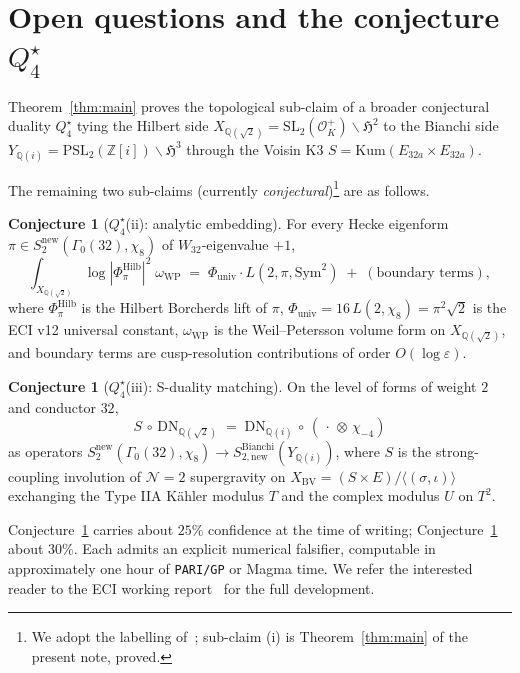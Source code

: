 \documentclass[11pt,a4paper]{article}
\theoremstyle{plain}
\theoremstyle{definition}
\newtheorem{conjecture}[theorem]{Conjecture}
\newcommand{\Q}{\mathbb{Q}}
\newcommand{\Z}{\mathbb{Z}}
\newcommand{\h}{\mathfrak{H}}
\newcommand{\OK}{\mathcal{O}_K}
\newcommand{\SL}{\mathrm{SL}}
\newcommand{\PSL}{\mathrm{PSL}}
\begin{document}
\section{Open questions and the conjecture $Q_{4}^{\star}$}
\label{sec:open}

Theorem~\ref{thm:main} proves the topological sub-claim of a broader
conjectural duality $Q_{4}^{\star}$ tying the Hilbert side
$X_{\Q(\sqrt 2)}=\SL_{2}(\OK^{+})\backslash\h^{2}$
to the Bianchi side $Y_{\Q(i)}=\PSL_{2}(\Z[i])\backslash\h^{3}$
through the Voisin K3 $S=\mathrm{Kum}(E_{32a}\times E_{32a})$.

The remaining two sub-claims (currently \emph{conjectural})\footnote{We
adopt the labelling of~\cite{ECI2026}; sub-claim (i) is
Theorem~\ref{thm:main} of the present note, proved.} are as follows.

\begin{conjecture}[$Q_{4}^{\star}$(ii): analytic embedding]
\label{conj:embedding}
For every Hecke eigenform $\pi\in S_{2}^{\mathrm{new}}(\Gamma_{0}(32),\chi_{8})$
of $W_{32}$-eigenvalue $+1$,
\[
   \int_{X_{\Q(\sqrt 2)}}\!\!\log|\Phi^{\mathrm{Hilb}}_{\pi}|^{2}\;\omega_{\mathrm{WP}}
   \;=\; \Phi_{\mathrm{univ}}\cdot L(2,\pi,\mathrm{Sym}^{2})
   \;+\; (\text{boundary terms}),
\]
where $\Phi^{\mathrm{Hilb}}_{\pi}$ is the Hilbert Borcherds lift of $\pi$,
$\Phi_{\mathrm{univ}}=16\,L(2,\chi_{8})=\pi^{2}\sqrt 2$ is the ECI v12
universal constant, $\omega_{\mathrm{WP}}$ is the Weil--Petersson volume
form on $X_{\Q(\sqrt 2)}$, and boundary terms are cusp-resolution
contributions of order $O(\log\varepsilon)$.
\end{conjecture}

\begin{conjecture}[$Q_{4}^{\star}$(iii): S-duality matching]
\label{conj:Sduality}
On the level of forms of weight $2$ and conductor $32$,
\[
   S\,\circ\,\mathrm{DN}_{\Q(\sqrt 2)}
   \;=\;
   \mathrm{DN}_{\Q(i)}\,\circ\,({}\,\cdot\,\otimes\,\chi_{-4})
\]
as operators
$S_{2}^{\mathrm{new}}(\Gamma_{0}(32),\chi_{8})\to S^{\mathrm{Bianchi}}_{2,\mathrm{new}}(Y_{\Q(i)})$,
where $S$ is the strong-coupling involution of $\mathcal N=2$
supergravity on $X_{\mathrm{BV}}=(S\times E)/\langle(\sigma,\iota)\rangle$
exchanging the Type IIA K\"ahler modulus $T$ and the complex modulus $U$
on $T^{2}$.
\end{conjecture}

Conjecture~\ref{conj:embedding} carries about $25\%$ confidence at the
time of writing; Conjecture~\ref{conj:Sduality} about $30\%$. Each
admits an explicit numerical falsifier, computable in approximately one
hour of \texttt{PARI/GP} or Magma time. We refer the interested reader
to the ECI working report~\cite{ECI2026} for the full development.
\end{document}
